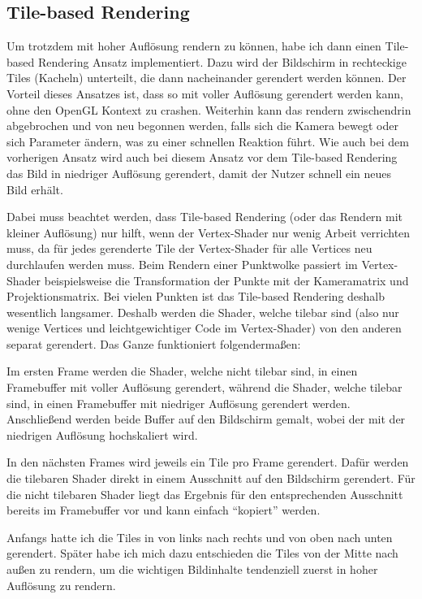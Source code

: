 \documentclass[
	ngerman,%
	accentcolor=9c,%
	ruledheaders=section,%
	class=report,%
	thesis={type=bachelor},%
	fontsize=11pt,%
	parskip=half-,%
	custommargins=true,%
	marginpar=false,%
]{tudapub}
\begin{document}
\subsection{Tile-based Rendering}
\label{sec:tilebased}
Um trotzdem mit hoher Auflösung rendern zu können, habe ich dann einen Tile-based Rendering Ansatz implementiert. 
Dazu wird der Bildschirm in rechteckige Tiles (Kacheln) unterteilt, die dann nacheinander gerendert werden können. Der Vorteil dieses Ansatzes ist, dass so mit voller Auflösung gerendert werden kann, ohne den OpenGL Kontext zu crashen. Weiterhin kann das rendern zwischendrin abgebrochen und von neu begonnen werden, falls sich die Kamera bewegt oder sich Parameter ändern, was zu einer schnellen Reaktion führt. Wie auch bei dem vorherigen Ansatz wird auch bei diesem Ansatz vor dem Tile-based Rendering das Bild in niedriger Auflösung gerendert, damit der Nutzer schnell ein neues Bild erhält.

Dabei muss beachtet werden, dass Tile-based Rendering (oder das Rendern mit kleiner Auflösung) nur hilft, wenn der Vertex-Shader nur wenig Arbeit verrichten muss, da für jedes gerenderte Tile der Vertex-Shader für alle Vertices neu durchlaufen werden muss. 
Beim Rendern einer Punktwolke passiert im Vertex-Shader beispielsweise die Transformation der Punkte mit der Kameramatrix und Projektionsmatrix. Bei vielen Punkten ist das Tile-based Rendering deshalb wesentlich langsamer.
Deshalb werden die Shader, welche tilebar sind (also nur wenige Vertices und leichtgewichtiger Code im Vertex-Shader) von den anderen separat gerendert. Das Ganze funktioniert folgendermaßen:

Im ersten Frame werden die Shader, welche nicht tilebar sind, in einen Framebuffer mit voller Auflösung gerendert, während die Shader, welche tilebar sind, in einen Framebuffer mit niedriger Auflösung gerendert werden. Anschließend werden beide Buffer auf den Bildschirm gemalt, wobei der mit der niedrigen Auflösung hochskaliert wird.

In den nächsten Frames wird jeweils ein Tile pro Frame gerendert. Dafür werden die tilebaren Shader direkt in einem Ausschnitt auf den Bildschirm gerendert. Für die nicht tilebaren Shader liegt das Ergebnis für den entsprechenden Ausschnitt bereits im Framebuffer vor und kann einfach \enquote{kopiert} werden.


Anfangs hatte ich die Tiles in von links nach rechts und von oben nach unten gerendert. Später habe ich mich dazu entschieden die Tiles von der Mitte nach außen zu rendern, um die wichtigen Bildinhalte tendenziell zuerst in hoher Auflösung zu rendern.
\end{document}
